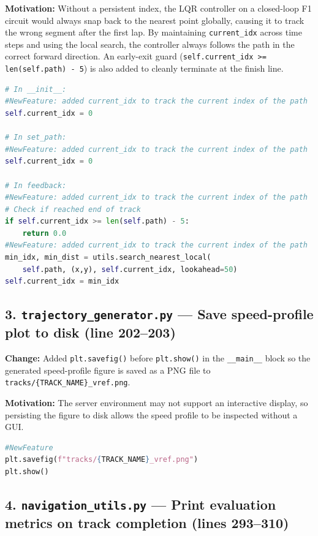 \documentclass[11pt]{article}
\begin{document}
\begin{enumerate}
\textbf{Motivation:} Without a persistent index, the LQR controller on a closed-loop F1 circuit would always snap back to the nearest point globally, causing it to track the wrong segment after the first lap. By maintaining \texttt{current\_idx} across time steps and using the local search, the controller always follows the path in the correct forward direction. An early-exit guard (\texttt{self.current\_idx >= len(self.path) - 5}) is also added to cleanly terminate at the finish line.

\begin{lstlisting}[language=Python]
# In __init__:
#NewFeature: added current_idx to track the current index of the path
self.current_idx = 0

# In set_path:
#NewFeature: added current_idx to track the current index of the path
self.current_idx = 0

# In feedback:
#NewFeature: added current_idx to track the current index of the path
# Check if reached end of track
if self.current_idx >= len(self.path) - 5:
    return 0.0
#NewFeature: added current_idx to track the current index of the path
min_idx, min_dist = utils.search_nearest_local(
    self.path, (x,y), self.current_idx, lookahead=50)
self.current_idx = min_idx
\end{lstlisting}

\subsection*{3. \texttt{trajectory\_generator.py} --- Save speed-profile plot to disk (line 202--203)}

\textbf{Change:} Added \texttt{plt.savefig()} before \texttt{plt.show()} in the \texttt{\_\_main\_\_} block so the generated speed-profile figure is saved as a PNG file to \texttt{tracks/\{TRACK\_NAME\}\_vref.png}.

\textbf{Motivation:} The server environment may not support an interactive display, so persisting the figure to disk allows the speed profile to be inspected without a GUI.

\begin{lstlisting}[language=Python]
#NewFeature
plt.savefig(f"tracks/{TRACK_NAME}_vref.png")
plt.show()
\end{lstlisting}

\subsection*{4. \texttt{navigation\_utils.py} --- Print evaluation metrics on track completion (lines 293--310)}


\end{enumerate}
\end{document}
